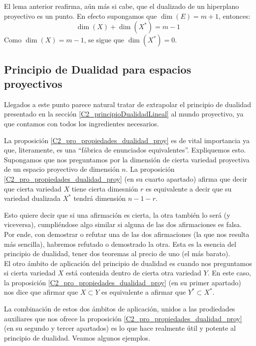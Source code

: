 \begin{obs}
	El lema anterior reafirma, aún más si cabe, que el dualizado de un hiperplano proyectivo es un punto. En efecto supongamos que $\dim(E)=m+1$, entonces:
	\begin{equation*}
	\dim(X)+\dim(X^*)=m-1
	\end{equation*}
	Como $\dim(X)=m-1$, se sigue que $\dim(X^*)=0$.
\end{obs}

\subsection{Principio de Dualidad para espacios proyectivos}
\label{C2_principioDualidadProyectiva}
Llegados a este punto parece natural tratar de extrapolar el principio de dualidad presentado en la sección \ref{C2_principioDualidadLineal} al mundo proyectivo, ya que contamos con todos los ingredientes necesarios.

La proposición \ref{C2_pro_propiedades_dualidad_proy} es de vital importancia ya que, literamente, es una ``fábrica de enunciados equivalentes''. Expliquemos esto.\\

Supongamos que nos preguntamos por la dimensión de cierta variedad proyectiva de un espacio proyectivo de dimensión $n$. La proposición \ref{C2_pro_propiedades_dualidad_proy} (en su cuarto apartado) afirma que decir que cierta variedad $X$ tiene cierta dimesnión $r$ es equivalente a decir que su variedad dualizada $X^*$ tendrá dimensión $n-1-r$.

Esto quiere decir que si una afirmación es cierta, la otra también lo será (y viceversa), cumpliéndose algo similar si alguna de las dos afirmaciones es falsa. Por ende, con demostrar o refutar una de las dos afirmaciones (la que nos resulta más sencilla), habremos refutado o demostrado la otra. Esta es la esencia del principio de dualidad, tener dos teoremas al precio de uno (el más barato).\\

El otro ámbito de aplicación del principio de dualidad es cuando nos preguntamos si cierta variedad $X$ está contenida dentro de cierta otra variedad $Y$. En este caso, la proposición \ref{C2_pro_propiedades_dualidad_proy} (en su primer apartado) nos dice que afirmar que $X\subset Y$ es equivalente a afirmar que $Y^*\subset X^*$.

La combinación de estos dos ámbitos de aplicación, unidos a las prodiedades auxiliares que nos ofrece la proposición \ref{C2_pro_propiedades_dualidad_proy} (en su segundo y tercer apartados) es lo que hace  realmente útil y potente al principio de dualidad. Veamos algunos ejemplos.


